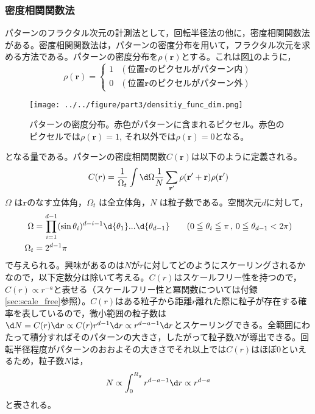 \documentclass[autodetect-engine,dvi=dvipdfmx,a4paper,ja=standard,oneside,openany,11pt]{bxjsbook}
\begin{document}
\subsubsection{密度相関関数法}
\label{sec:density_correlation}
パターンのフラクタル次元の計測法として，回転半径法の他に，密度相関関数法がある。密度相関関数法は，パターンの密度分布を用いて，フラクタル次元を求める方法である。パターンの密度分布を$\rho(\bm{r})$とする。これは図\ref{fig:density_func_dif}のように，
\begin{equation}
  \rho(\bm{r})=
  \begin{cases}
    1 & (\mathrm{位置}\bm{r}\mathrm{のピクセルがパターン内}) \\
    0 & (\mathrm{位置}\bm{r}\mathrm{のピクセルがパターン外})
  \end{cases}
  \label{eq:density_distribution}
\end{equation}

\begin{figure}[htbp]
  \centering
  \texttt{[image: ../../figure/part3/densitiy\_func\_dim.png]}
  \caption{パターンの密度分布。赤色がパターンに含まれるピクセル。赤色のピクセルでは$\rho(\bm{r})=1$, それ以外では$\rho(\bm{r})=0$となる。}
  \label{fig:density_func_dif}
\end{figure}

となる量である。パターンの密度相関関数$C(\bm{r})$は以下のように定義される。
\begin{equation}
  C(r)=\frac{1}{\Omega_t}\int \d\Omega \frac{1}{N}\sum_{{\bf{r'}}}\rho({\bf r'+ r})\rho({\bf {r'}})
  \label{eq:density_correlation}
\end{equation}
$\Omega$ は$\bm{r}$のなす立体角，$\Omega_t$ は全立体角，$N$ は粒子数である。空間次元$d$に対して，
\begin{equation}
  \begin{aligned}
    \Omega   & =\prod^{d-1}_{i=1} (\sin\theta_i)^{d-i-1} \d{\theta_1}...\d{\theta_{d-1}} \qquad(0\leqq \theta_i\leqq \pi\,,\,0\leqq\theta_{d-1}<2\pi) \\
    \Omega_t & =2^{d-1}\pi
  \end{aligned}
  \label{eq:omega}
\end{equation}
で与えられる。興味があるのは$N$が$r$に対してどのようにスケーリングされるかなので，以下定数分は除いて考える。$C(r)$はスケールフリー性を持つので，$C(r)\propto r^{-a}$と表せる（スケールフリー性と冪関数については付録\ref{sec:scale_free}参照）。$C(r)$はある粒子から距離$r$離れた際に粒子が存在する確率を表しているので，微小範囲の粒子数は$\d N=C(r)\d \bm{r}\propto C(r)r^{d-1}\d r\propto r^{d-a-1} \d r $とスケーリングできる。全範囲にわたって積分すればそのパターンの大きさ，したがって粒子数$N$が導出できる。回転半径程度がパターンのおおよその大きさでそれ以上では$C(r)$はほぼ0といえるため，粒子数$N$は，
\begin{equation}
  N\propto \int_{0}^{R_g} r^{d-a-1} \d r\propto r^{d-a}
  \label{eq:density_correlation_fractal}
\end{equation}
と表される。
\end{document}
